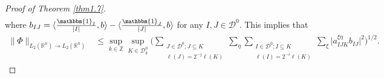 \documentclass[oneside,english,a4wide]{amsart}
\numberwithin{equation}{section}
\numberwithin{figure}{section}
\theoremstyle{plain}
\theoremstyle{plain}
\theoremstyle{definition}
\theoremstyle{plain}
\theoremstyle{remark}
\theoremstyle{definition}
\theoremstyle{remark}
\theoremstyle{definition}
\newcommand{\8}{\infty}
\begin{document}
\begin{proof}[Proof of Theorem \ref{thm1.7}]
\begin{equation*}
\begin{aligned}
	\end{aligned}
\end{equation*}
where $b_{IJ}= \langle \frac{\mathbbm{1}_I}{|I|},b\rangle-\langle \frac{\mathbbm{1}_J}{|J|},b\rangle$ for any $I, J\in \mathcal{ D}^0$.
This implies that
\begin{equation*}
	\begin{aligned}
		\|\varPhi\|_{L_2(\mathbb{R}^n)\to L_2(\mathbb{R}^n)}{}&\le \sup_{k\in\mathbb{Z}}\sup_{K\in\mathcal{D}^0_k}\biggl(\sum_{\substack{J\in\mathcal{D}^0;J\subseteq K\\ \ell(J)=2^{-j}\ell(K)}}\sum_{\eta}\sum_{\substack{I\in\mathcal{D}^0;I\subseteq K \\ \ell(I)=2^{-i}\ell(K)}}\sum_{ \xi}\bigg|a_{IJK}^{\xi\eta} b_{IJ}\bigg|^2\biggr)^{1/2}.
	\end{aligned}
\end{equation*}

\end{proof}
\end{document}
